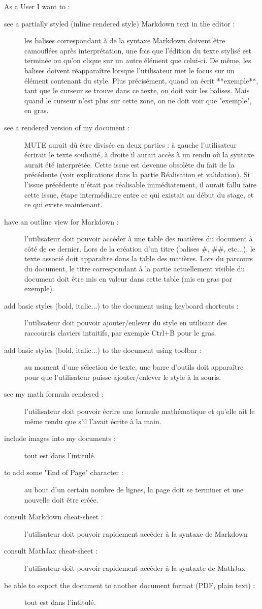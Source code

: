 \documentclass[12pt]{article}
\begin{document}
As a User I want to :
\begin{description}
    \item [see a partially styled (inline rendered style) Markdown text in the editor :] les balises correspondant à de la syntaxe Markdown doivent être camouflées après interprétation, une fois que l'édition du texte stylisé est terminée ou qu'on clique sur un autre élément que celui-ci. De même, les balises doivent réapparaître lorsque l'utilisateur met le focus sur un élément contenant du style.
    Plus précisément, quand on écrit **exemple**, tant que le curseur se trouve dans ce texte, on doit voir les balises. Mais quand le curseur n'est plus sur cette zone, on ne doit voir que "exemple", en gras.
    \item [see a rendered version of my document :]MUTE aurait dû être divisée en deux parties : à gauche l'utilisateur écrirait le texte souhaité, à droite il aurait accès à un rendu où la syntaxe aurait été interprétée. Cette issue est devenue obsolète du fait de la précédente (voir explications dans la partie Réalisation et validation). Si l'issue précédente n'était pas réalisable immédiatement, il aurait fallu faire cette issue, étape intermédiaire entre ce qui existait au début du stage, et ce qui existe maintenant.
    \item [have an outline view for Markdown :] l'utilisateur doit pouvoir accéder à une table des matières du document à côté de ce dernier. Lors de la création d'un titre (balises \#, \#\#, etc...), le texte associé doit apparaître dans la table des matières. Lors du parcours du document, le titre correspondant à la partie actuellement visible du document doit être mis en valeur dans cette table (mis en gras par exemple).
    \item [add basic styles (bold, italic...) to the document using keyboard shortcuts :]l'utilisateur doit pouvoir ajouter/enlever du style en utilisant des raccourcis claviers intuitifs, par exemple Ctrl+B pour le gras.
    \item [add basic styles (bold, italic...) to the document using toolbar :]au moment d'une sélection de texte, une barre d'outils doit apparaître pour que l'utilisateur puisse ajouter/enlever le style à la souris.
    \item [see my math formula rendered :]l'utilisateur doit pouvoir écrire une formule mathématique et qu'elle ait le même rendu que s'il l'avait écrite à la main.
    \item [include images into my documents :]tout est dans l'intitulé.
    \item [to add some "End of Page" character :]au bout d'un certain nombre de lignes, la page doit se terminer et une nouvelle doit être créée.
    \item [consult Markdown cheat-sheet :]l'utilisateur doit pouvoir rapidement accéder à la syntaxe de Markdown
    \item [consult MathJax cheat-sheet :]l'utilisateur doit pouvoir rapidement accéder à la syntaxte de MathJax
    \item [be able to export the document to another document format (PDF, plain text) :]tout est dans l'intitulé.\\
\end{description}
\end{document}
